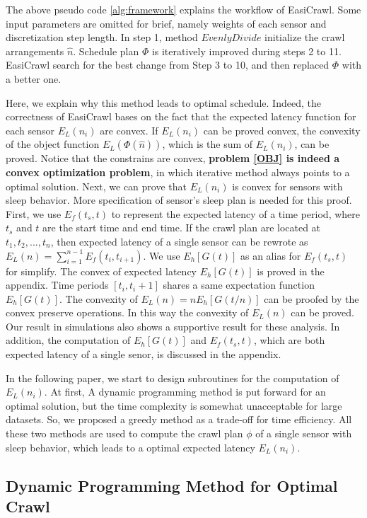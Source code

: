 \documentclass[conference]{IEEEtran}
\begin{document}
The above pseudo code \ref{alg:framework} explains the workflow of EasiCrawl. 
Some input parameters are omitted for brief, namely weights of each sensor and discretization step length.
In step 1, method $EvenlyDivide$ initialize the crawl arrangements $\hat{n}$. 
Schedule plan $\Phi$ is iteratively improved during steps 2 to 11. 
EasiCrawl search for the best change from Step 3 to 10, and then replaced $\Phi$ with a better one.

Here, we explain why this method leads to optimal schedule.
Indeed, the correctness of EasiCrawl bases on the fact that the expected latency function for each sensor $E_L(n_i)$ are convex. 
If $E_L(n_i)$ can be proved convex, the convexity of the object function $E_L(\Phi(\hat{n}))$, which is the sum of $E_L(n_i)$, can be proved.
Notice that the constrains are convex, \textbf{problem \eqref{OBJ} is indeed a convex optimization problem}, in which iterative method always points to a optimal solution.
Next, we can prove that $E_L(n_i)$ is convex for sensors with sleep behavior.
More specification of sensor's sleep plan is needed for this proof.
First, we use $E_f(t_s,t)$ to represent the expected latency of a time period, where $t_s$ and $t$ are the start time and end time. 
If the crawl plan are located at $t_1,t_2,...,t_n$, then expected latency of a single sensor can be rewrote as $E_L(n) = \sum_{i=1}^{n-1}E_f(t_{i},t_{i+1})$. 
We use $E_h[G(t)]$ as an alias for $E_f(t_s,t)$ for simplify.
The convex of expected latency $E_h[G(t)]$ is proved in the appendix. 
Time periods $[t_i,t_i+1]$ shares a same expectation function $E_h[G(t)]$. 
The convexity of $E_L(n) = n E_h[G(t/n)]$ can be proofed by the convex preserve operations\cite{boyd2004convex}. 
In this way the convexity of $E_L(n)$ can be proved.
Our result in simulations also shows a supportive result for these analysis.
In addition, the computation of $E_h[G(t)]$ and $E_f(t_s,t)$, which are both expected latency of a single senor, is discussed in the appendix.

In the following paper, we start to design subroutines for the computation of $E_L(n_i)$.
At first, A dynamic programming method is put forward for an optimal solution,  but the time complexity is somewhat unacceptable for large datasets.
So, we proposed a greedy method as a trade-off for time efficiency. 
All these two methods are used to compute the crawl plan $\phi$ of a single sensor with sleep behavior, which leads to a optimal expected latency $E_L(n_i)$.

\subsection{Dynamic Programming Method for Optimal Crawl}
\end{document}
